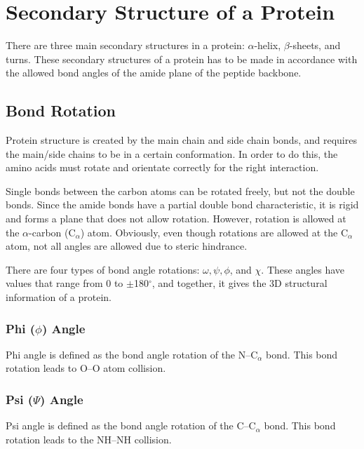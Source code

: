 \section{Secondary Structure of a Protein}

There are three main secondary structures in a protein: $\alpha$-helix, $\beta$-sheets, and turns.
These secondary structures of a protein has to be made in accordance with the allowed bond angles of the amide plane of the peptide backbone.

\subsection{Bond Rotation}

Protein structure is created by the main chain and side chain bonds, and requires the main/side chains to be in a certain conformation.
In order to do this, the amino acids must rotate and orientate correctly for the right interaction.

Single bonds between the carbon atoms can be rotated freely, but not the double bonds.
Since the amide bonds have a partial double bond characteristic, it is rigid and forms a plane that does not allow rotation.
However, rotation is allowed at the $\alpha$-carbon (C$_{\alpha}$) atom.
Obviously, even though rotations are allowed at the C$_{\alpha}$ atom, not all angles are allowed due to steric hindrance.

There are four types of bond angle rotations: $\omega, \psi, \phi$, and $\chi$.
These angles have values that range from 0 to $\pm$180$^{\circ}$, and together, it gives the 3D structural information of a protein.

\subsubsection{Phi ($\phi$) Angle}

Phi angle is defined as the bond angle rotation of the N--C$_{\alpha}$ bond.
This bond rotation leads to O--O atom collision.

\subsubsection{Psi ($\Psi$) Angle}

Psi angle is defined as the bond angle rotation of the C--C$_{\alpha}$ bond.
This bond rotation leads to the NH--NH collision.

\vspace{1.0cm}

